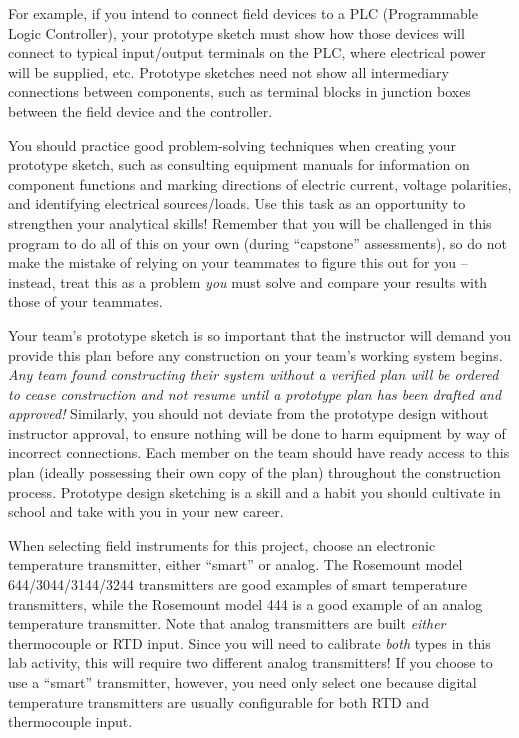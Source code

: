 \begin{itemize}
For example, if you intend to connect field devices to a PLC (Programmable Logic Controller), your prototype sketch must show how those devices will connect to typical input/output terminals on the PLC, where electrical power will be supplied, etc.  Prototype sketches need not show all intermediary connections between components, such as terminal blocks in junction boxes between the field device and the controller.

You should practice good problem-solving techniques when creating your prototype sketch, such as consulting equipment manuals for information on component functions and marking directions of electric current, voltage polarities, and identifying electrical sources/loads.  Use this task as an opportunity to strengthen your analytical skills!  Remember that you will be challenged in this program to do all of this on your own (during ``capstone'' assessments), so do not make the mistake of relying on your teammates to figure this out for you -- instead, treat this as a problem {\it you} must solve and compare your results with those of your teammates.

Your team's prototype sketch is so important that the instructor will demand you provide this plan before any construction on your team's working system begins.  {\it Any team found constructing their system without a verified plan will be ordered to cease construction and not resume until a prototype plan has been drafted and approved!}  Similarly, you should not deviate from the prototype design without instructor approval, to ensure nothing will be done to harm equipment by way of incorrect connections.  Each member on the team should have ready access to this plan (ideally possessing their own copy of the plan) throughout the construction process.  Prototype design sketching is a skill and a habit you should cultivate in school and take with you in your new career.

\vskip 10pt

When selecting field instruments for this project, choose an electronic temperature transmitter, either ``smart'' or analog.  The Rosemount model 644/3044/3144/3244 transmitters are good examples of smart temperature transmitters, while the Rosemount model 444 is a good example of an analog temperature transmitter.  Note that analog transmitters are built {\it either} thermocouple or RTD input.  Since you will need to calibrate {\it both} types in this lab activity, this will require two different analog transmitters!  If you choose to use a ``smart'' transmitter, however, you need only select one because digital temperature transmitters are usually configurable for both RTD and thermocouple input.


\end{itemize}
